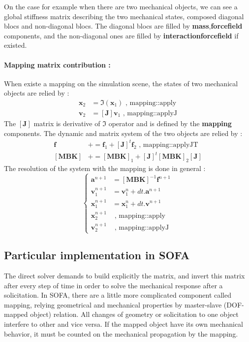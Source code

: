 On the case for example when there are two mechanical objects, we can see a global stiffness matrix describing the two mechanical states, composed diagonal blocs and non-diagonal blocs. The diagonal blocs are filled by \textbf{mass},\textbf{forcefield} components, and the non-diagonal ones are filled by \textbf{interactionforcefield} if existed.
\paragraph{Mapping matrix contribution : } When existe a mapping on the simulation scene, the states of two mechanical objects are relied by : 
\[
\begin{array}{rl}
\textbf{x}_{2} & = \Im\left(\textbf{x}_{1}\right)           \text{      ,	mapping::apply}             \\
\textbf{v}_{2} & = \left[\textbf{J}\right] \textbf{v}_{1}   \text{      ,	mapping::applyJ}  
\end{array}
\]
The $\left[\textbf{J}\right]$ matrix is derivative of $\Im$ operator and is defined by the \textbf{mapping} components. The dynamic and matrix system of the two objects are relied by :   
\[
\begin{array}{rl}
\textbf{f}                  & += \textbf{f}_{1}  +   \left[\textbf{J}\right]^{t} \textbf{f}_{2}         \text{      ,	mapping::applyJT}             \\
\left[ \textbf{MBK} \right] & += \left[ \textbf{MBK} \right]_{1}  + \left[\textbf{J}\right]^{t}  \left[ \textbf{MBK} \right]_{2} \left[\textbf{J}\right]
\end{array}
\]
The resolution of the system with the mapping is done in general :
\[
\left\{ 
\begin{array}{rl}
\textbf{a}^{n+1}        & = \left[ \textbf{MBK} \right]^{-1}  \textbf{f}^{n+1}    \\
\textbf{v}^{n+1}_{1}    & = \textbf{v}^{n}_{1}     + dt.\textbf{a}^{n+1}         \\
\textbf{x}^{n+1}_{1}    & = \textbf{x}^{n}_{1}     + dt.\textbf{v}^{n+1}         \\
\textbf{x}^{n+1}_{2}    &  \text{ ,	mapping::apply }     \\
\textbf{v}^{n+1}_{2}    &  \text{ ,	mapping::applyJ }          
\end{array}
\right.
\]



\subsection{Particular implementation in SOFA}
The direct solver demands to build explicitly the matrix, and invert this matrix after every step of time in order to solve the mechanical response after a solicitation. In SOFA, there are a little more complicated component called mapping, relying geometrical and mechanical properties by master-slave (DOF-mapped object) relation. All changes of geometry or solicitation to one object interfere to other and vice versa. If the mapped object have its own mechanical behavior, it must be counted on the mechanical propagation by the mapping.
